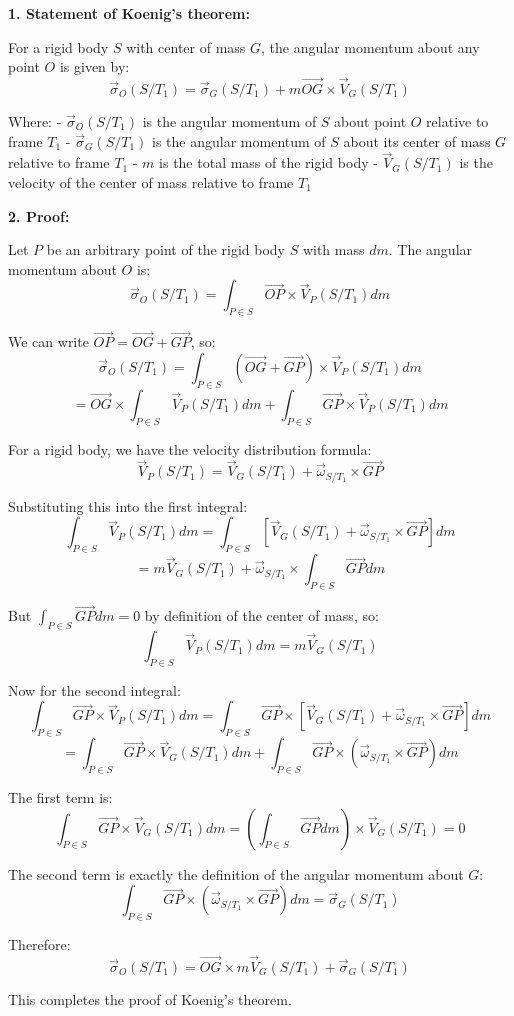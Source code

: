\documentclass[12pt]{article}
\begin{document}
\begin{correctionbox}
\textbf{1. Statement of Koenig's theorem:}

For a rigid body $S$ with center of mass $G$, the angular momentum about any point $O$ is given by:
$$\vec{\sigma}_O(S/T_1) = \vec{\sigma}_G(S/T_1) + m\vec{OG} \times \vec{V}_G(S/T_1)$$

Where:
- $\vec{\sigma}_O(S/T_1)$ is the angular momentum of $S$ about point $O$ relative to frame $T_1$
- $\vec{\sigma}_G(S/T_1)$ is the angular momentum of $S$ about its center of mass $G$ relative to frame $T_1$
- $m$ is the total mass of the rigid body
- $\vec{V}_G(S/T_1)$ is the velocity of the center of mass relative to frame $T_1$

\textbf{2. Proof:}

Let $P$ be an arbitrary point of the rigid body $S$ with mass $dm$. The angular momentum about $O$ is:
$$\vec{\sigma}_O(S/T_1) = \int_{P \in S} \vec{OP} \times \vec{V}_P(S/T_1)  dm$$

We can write $\vec{OP} = \vec{OG} + \vec{GP}$, so:
$$\vec{\sigma}_O(S/T_1) = \int_{P \in S} (\vec{OG} + \vec{GP}) \times \vec{V}_P(S/T_1)  dm$$
$$= \vec{OG} \times \int_{P \in S} \vec{V}_P(S/T_1)  dm + \int_{P \in S} \vec{GP} \times \vec{V}_P(S/T_1)  dm$$

For a rigid body, we have the velocity distribution formula:
$$\vec{V}_P(S/T_1) = \vec{V}_G(S/T_1) + \vec{\omega}_{S/T_1} \times \vec{GP}$$

Substituting this into the first integral:
$$\int_{P \in S} \vec{V}_P(S/T_1)  dm = \int_{P \in S} [\vec{V}_G(S/T_1) + \vec{\omega}_{S/T_1} \times \vec{GP}]  dm$$
$$= m\vec{V}_G(S/T_1) + \vec{\omega}_{S/T_1} \times \int_{P \in S} \vec{GP}  dm$$

But $\int_{P \in S} \vec{GP}  dm = 0$ by definition of the center of mass, so:
$$\int_{P \in S} \vec{V}_P(S/T_1)  dm = m\vec{V}_G(S/T_1)$$

Now for the second integral:
$$\int_{P \in S} \vec{GP} \times \vec{V}_P(S/T_1)  dm = \int_{P \in S} \vec{GP} \times [\vec{V}_G(S/T_1) + \vec{\omega}_{S/T_1} \times \vec{GP}]  dm$$
$$= \int_{P \in S} \vec{GP} \times \vec{V}_G(S/T_1)  dm + \int_{P \in S} \vec{GP} \times (\vec{\omega}_{S/T_1} \times \vec{GP})  dm$$

The first term is:
$$\int_{P \in S} \vec{GP} \times \vec{V}_G(S/T_1)  dm = \left(\int_{P \in S} \vec{GP}  dm\right) \times \vec{V}_G(S/T_1) = 0$$

The second term is exactly the definition of the angular momentum about $G$:
$$\int_{P \in S} \vec{GP} \times (\vec{\omega}_{S/T_1} \times \vec{GP})  dm = \vec{\sigma}_G(S/T_1)$$

Therefore:
$$\vec{\sigma}_O(S/T_1) = \vec{OG} \times m\vec{V}_G(S/T_1) + \vec{\sigma}_G(S/T_1)$$

This completes the proof of Koenig's theorem.
\end{correctionbox}
\end{document}
